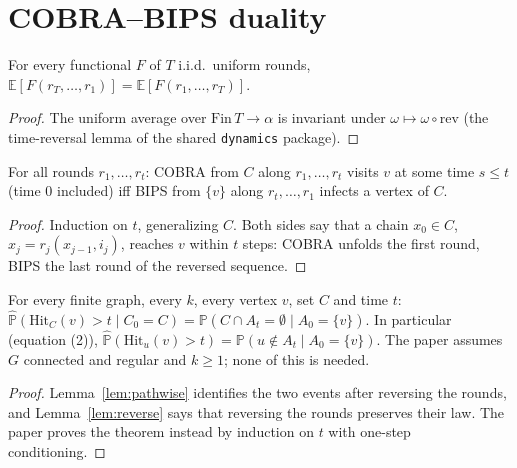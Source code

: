 \section{COBRA--BIPS duality}
\begin{lemma}\label{lem:reverse}
\leanok
For every functional $F$ of $T$ i.i.d.\ uniform rounds,
$\mathbb E[F(r_T,\dots,r_1)]=\mathbb E[F(r_1,\dots,r_T)]$.
\end{lemma}
\begin{proof}\leanok
The uniform average over $\mathrm{Fin}\,T\to\alpha$ is invariant under $\omega\mapsto\omega\circ\mathrm{rev}$
(the time-reversal lemma of the shared \texttt{dynamics} package).
\end{proof}
\begin{lemma}\label{lem:pathwise}
\leanok{}
For all rounds $r_1,\dots,r_t$: COBRA from $C$ along $r_1,\dots,r_t$ visits $v$ at some time
$s\le t$ (time $0$ included) iff BIPS from $\{v\}$ along $r_t,\dots,r_1$ infects a vertex of $C$.
\end{lemma}
\begin{proof}\leanok
Induction on $t$, generalizing $C$. Both sides say that a chain $x_0\in C$,
$x_j=r_j(x_{j-1},i_j)$, reaches $v$ within $t$ steps: COBRA unfolds the first round, BIPS the
last round of the reversed sequence.
\end{proof}
\begin{theorem}\label{thm:duality}
\leanok{}
For every finite graph, every $k$, every vertex $v$, set $C$ and time $t$:
$\hat{\mathbb P}(\mathrm{Hit}_C(v)>t\mid C_0=C)=\mathbb P(C\cap A_t=\emptyset\mid A_0=\{v\})$. In
particular (equation (2)), $\hat{\mathbb P}(\mathrm{Hit}_u(v)>t)=\mathbb P(u\notin A_t\mid A_0=\{v\})$.
The paper assumes $G$ connected and regular and $k\ge1$; none of this is needed.
\end{theorem}
\begin{proof}\leanok
Lemma~\ref{lem:pathwise} identifies the two events after reversing the rounds, and
Lemma~\ref{lem:reverse} says that reversing the rounds preserves their law. The paper proves the
theorem instead by induction on $t$ with one-step conditioning.
\end{proof}
